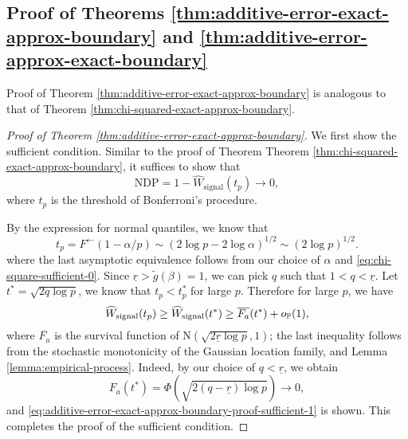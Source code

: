 \subsection{Proof of Theorems \ref{thm:additive-error-exact-approx-boundary} and \ref{thm:additive-error-approx-exact-boundary}}
\label{subsec:proof-additive-error-mix-boundaries}

Proof of Theorem \ref{thm:additive-error-exact-approx-boundary} is analogous to that of Theorem \ref{thm:chi-squared-exact-approx-boundary}.

\begin{proof}[Proof of Theorem \ref{thm:additive-error-exact-approx-boundary}]
We first show the sufficient condition.
Similar to the proof of Theorem Theorem \ref{thm:chi-squared-exact-approx-boundary}, it suffices to show that
\begin{equation} \label{eq:additive-error-exact-approx-boundary-proof-sufficient-1}
    \text{NDP} = 1 - \widehat{W}_\text{signal}(t_p) \to 0,
\end{equation}
where $t_p$ is the threshold of Bonferroni's procedure.

By the expression for normal quantiles, we know that 
$$
t_p=F^\leftarrow(1-\alpha/p)\sim(2\log{p}-2\log{\alpha})^{1/2} \sim(2\log{p})^{1/2}.
$$
where the last asymptotic equivalence follows from our choice of $\alpha$ and \eqref{eq:chi-square-sufficient-0}.
Since $\underline{r}>\widetilde{g}(\beta)=1$, we can pick $q$ such that $1<q<\underline{r}$.
Let $t^* = \sqrt{2q\log{p}}$, we know that $t_p<t_p^*$ for large $p$.
Therefore for large $p$, we have
$$
\widehat{W}_\text{signal}(t_p) \ge \widehat{W}_\text{signal}(t^*) \ge \overline{F_a}(t^*) + o_\P(1),
$$
where $\overline{F_a}$ is the survival function of $\mathrm{N}(\sqrt{2\underline{r}\log{p}}, 1)$; the last inequality follows from the stochastic monotonicity of the Gaussian location family, and Lemma \ref{lemma:empirical-process}.
Indeed, by our choice of $q<\underline{r}$, we obtain
$$
F_a(t^*) = \Phi\left(\sqrt{2(q-\underline{r})\log{p}}\right)\to0,
$$
and \eqref{eq:additive-error-exact-approx-boundary-proof-sufficient-1} is shown. 
This completes the proof of the sufficient condition.


\end{proof}
